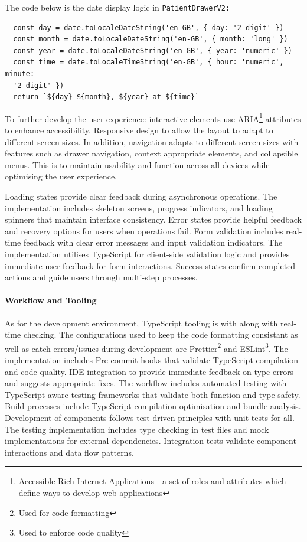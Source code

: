 The code below is the date display logic in \texttt{PatientDrawerV2:}
\begin{verbatim}
  const day = date.toLocaleDateString('en-GB', { day: '2-digit' })
  const month = date.toLocaleDateString('en-GB', { month: 'long' })
  const year = date.toLocaleDateString('en-GB', { year: 'numeric' })
  const time = date.toLocaleTimeString('en-GB', { hour: 'numeric', minute:
  '2-digit' })
  return `${day} ${month}, ${year} at ${time}`
\end{verbatim}

To further develop the user experience: interactive elements use ARIA\footnote{Accessible Rich Internet Applications - a set of roles and attributes which define ways to develop web applications} attributes to enhance accessibility. Responsive design to allow the layout to adapt to different screen sizes. In addition, navigation adapts to different screen sizes with features such as drawer navigation, context appropriate elements, and collapsible menus. This is to maintain usability and function across all devices while optimising the user experience.

Loading states provide clear feedback during asynchronous operations. The implementation includes skeleton screens, progress indicators, and loading spinners that maintain interface consistency. Error states provide helpful feedback and recovery options for users when operations fail.
Form validation includes real-time feedback with clear error messages and input validation indicators. The implementation utilises TypeScript for client-side validation logic and provides immediate user feedback for form interactions. Success states confirm completed actions and guide users through multi-step processes.

\paragraph{Workflow and Tooling}\mbox{}

As for the development environment, TypeScript tooling is with along with real-time checking. The configurations used to keep the code formatting consistant as well as catch errors/issues during development are Prettier\footnote{Used for code formatting} and ESLint\footnote{Used to enforce code quality}. The implementation includes Pre-commit hooks that validate TypeScript compilation and code quality.
IDE integration to provide immediate feedback on type errors and suggests appropriate fixes. The workflow includes automated testing with TypeScript-aware testing frameworks that validate both function and type safety. Build processes include TypeScript compilation optimisation and bundle analysis.
Development of components follows test-driven principles with unit tests for all. The testing implementation includes type checking in test files and mock implementations for external dependencies. Integration tests validate component interactions and data flow patterns.

